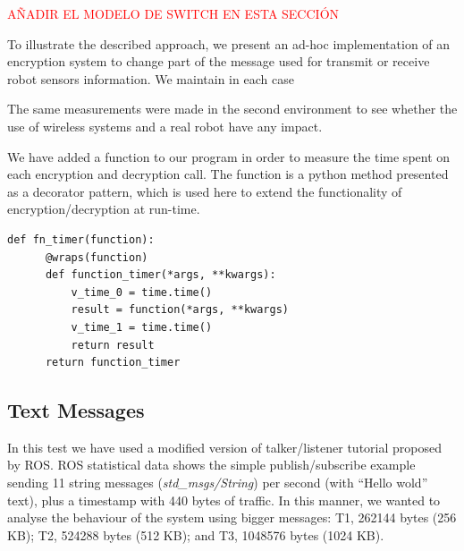 \documentclass[journal,twoside]{JoPhA}
\begin{document}
\textcolor{red}{A\~NADIR EL MODELO DE SWITCH EN ESTA SECCI\'ON}

To illustrate the described approach, we present an ad-hoc implementation of an encryption system to change part of the message used for transmit or receive robot sensors information. 
We maintain in each case 


The same measurements were made in the second environment to see whether the use of wireless systems and a real robot have any impact.



We have added a function to our program in order to measure the time spent on each encryption and decryption call. The function is a python method presented as a decorator pattern, which is used here to extend the functionality of encryption/decryption at run-time. 


{
  \footnotesize{
    \begin{Verbatim}[frame=single]
def fn_timer(function):
	  @wraps(function)
	  def function_timer(*args, **kwargs):
	      v_time_0 = time.time()
	      result = function(*args, **kwargs)
	      v_time_1 = time.time()
	      return result
	  return function_timer
    \end{Verbatim}
  }
}


\subsection{Text Messages}

In this test we have used a modified version of talker/listener tutorial proposed by ROS. 
ROS statistical data shows the simple publish/subscribe example sending 11 string messages ({\em std\_msgs/String}) per second (with ``Hello wold'' text), plus a timestamp with 440 bytes of traffic.
In this manner, we wanted to analyse the behaviour of the system using bigger messages: T1, 262144 bytes (256 KB); T2, 524288 bytes (512 KB); and T3, 1048576 bytes (1024 KB).
\end{document}
